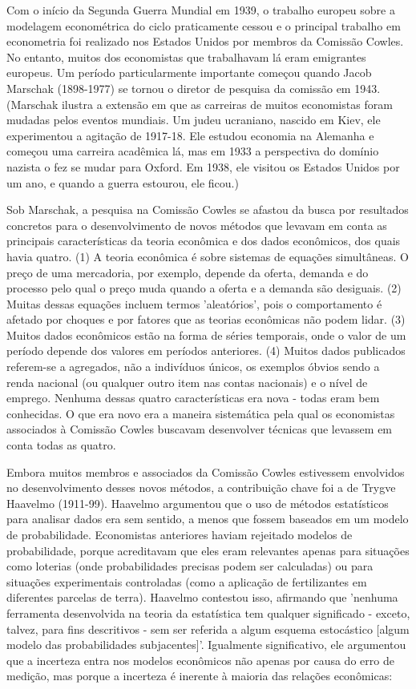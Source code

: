 \documentclass[12pt]{article}
\begin{document}
Com o início da Segunda Guerra Mundial em 1939, o trabalho europeu sobre a modelagem econométrica do ciclo praticamente cessou e o principal trabalho em econometria foi realizado nos Estados Unidos por membros da Comissão Cowles. No entanto, muitos dos economistas que trabalhavam lá eram emigrantes europeus. Um período particularmente importante começou quando Jacob Marschak (1898-1977) se tornou o diretor de pesquisa da comissão em 1943. (Marschak ilustra a extensão em que as carreiras de muitos economistas foram mudadas pelos eventos mundiais. Um judeu ucraniano, nascido em Kiev, ele experimentou a agitação de 1917-18. Ele estudou economia na Alemanha e começou uma carreira acadêmica lá, mas em 1933 a perspectiva do domínio nazista o fez se mudar para Oxford. Em 1938, ele visitou os Estados Unidos por um ano, e quando a guerra estourou, ele ficou.)

Sob Marschak, a pesquisa na Comissão Cowles se afastou da busca por resultados concretos para o desenvolvimento de novos métodos que levavam em conta as principais características da teoria econômica e dos dados econômicos, dos quais havia quatro. (1) A teoria econômica é sobre sistemas de equações simultâneas. O preço de uma mercadoria, por exemplo, depende da oferta, demanda e do processo pelo qual o preço muda quando a oferta e a demanda são desiguais. (2) Muitas dessas equações incluem termos 'aleatórios', pois o comportamento é afetado por choques e por fatores que as teorias econômicas não podem lidar. (3) Muitos dados econômicos estão na forma de séries temporais, onde o valor de um período depende dos valores em períodos anteriores. (4) Muitos dados publicados referem-se a agregados, não a indivíduos únicos, os exemplos óbvios sendo a renda nacional (ou qualquer outro item nas contas nacionais) e o nível de emprego. Nenhuma dessas quatro características era nova - todas eram bem conhecidas. O que era novo era a maneira sistemática pela qual os economistas associados à Comissão Cowles buscavam desenvolver técnicas que levassem em conta todas as quatro.

Embora muitos membros e associados da Comissão Cowles estivessem envolvidos no desenvolvimento desses novos métodos, a contribuição chave foi a de Trygve Haavelmo (1911-99). Haavelmo argumentou que o uso de métodos estatísticos para analisar dados era sem sentido, a menos que fossem baseados em um modelo de probabilidade. Economistas anteriores haviam rejeitado modelos de probabilidade, porque acreditavam que eles eram relevantes apenas para situações como loterias (onde probabilidades precisas podem ser calculadas) ou para situações experimentais controladas (como a aplicação de fertilizantes em diferentes parcelas de terra). Haavelmo contestou isso, afirmando que 'nenhuma ferramenta desenvolvida na teoria da estatística tem qualquer significado - exceto, talvez, para fins descritivos - sem ser referida a algum esquema estocástico [algum modelo das probabilidades subjacentes]'. Igualmente significativo, ele argumentou que a incerteza entra nos modelos econômicos não apenas por causa do erro de medição, mas porque a incerteza é inerente à maioria das relações econômicas:
\end{document}
